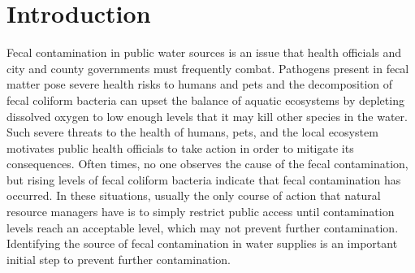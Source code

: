 \chapter{Introduction}\label{chap:introduction}
Fecal contamination in public water sources is an issue that health officials and city and county governments must frequently combat.
Pathogens present in fecal matter pose severe health risks to humans and pets
and
the decomposition of fecal coliform bacteria can upset the balance of aquatic ecosystems by depleting dissolved oxygen to low enough levels that it may kill other species in the water.
Such severe threats to the health of humans, pets, and the local ecosystem motivates public health officials to take action in order to mitigate its consequences.
Often times, no one observes the cause of the fecal contamination, but rising levels of fecal coliform bacteria indicate that fecal contamination has occurred.
In these situations, usually the only course of action that natural resource managers have is to simply restrict public access until contamination levels reach an acceptable level, which may not prevent further contamination.
Identifying the source of fecal contamination in water supplies is an important initial step to prevent further contamination.

